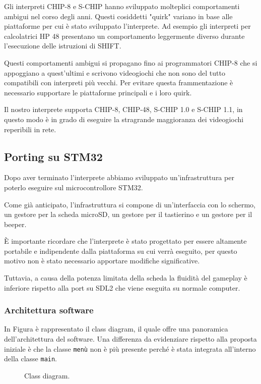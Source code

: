 \documentclass[a4paper]{article}
\begin{document}
Gli interpreti CHIP-8 e S-CHIP hanno sviluppato molteplici
comportamenti ambigui nel corso degli anni. Questi cosiddetti
"quirk" variano in base alle piattaforme per cui è stato sviluppato
l'interprete. Ad esempio gli interpreti per calcolatrici HP 48
presentano un comportamento leggermente diverso durante l'esecuzione
delle istruzioni di SHIFT.

Questi comportamenti ambigui si propagano fino ai programmatori
CHIP-8 che si appoggiano a quest'ultimi e scrivono videogiochi che
non sono del tutto compatibili con interpreti più vecchi. Per evitare
questa frammentazione è necessario supportare le piattaforme
principali e i loro quirk.

Il nostro interprete supporta CHIP-8, CHIP-48, S-CHIP 1.0 e
S-CHIP 1.1, in questo modo è in grado di eseguire la stragrande
maggioranza dei videogiochi reperibili in rete.

\subsection{Porting su STM32}

Dopo aver terminato l'interprete abbiamo sviluppato un'infrastruttura per poterlo eseguire
sul microcontrollore STM32.

Come già anticipato, l'infrastruttura si compone di un'interfaccia con lo schermo,
un gestore per la scheda microSD, un gestore per il tastierino e un gestore per il beeper.

È importante ricordare che l'interprete è stato progettato per essere altamente portabile
e indipendente dalla piattaforma su cui verrà eseguito, per questo motivo non è stato necessario
apportare modifiche significative.

Tuttavia, a causa della potenza limitata della scheda la fluidità del gameplay è inferiore
rispetto alla port su SDL2 che viene eseguita su normale computer.

\subsubsection{Architettura software}

In Figura \label{fig:class_diagram} è rappresentato il class diagram, il quale offre una panoramica
dell'architettura del software. Una differenza da evidenziare rispetto alla proposta iniziale
è che la classe \texttt{menù} non è più presente perché è stata integrata all'interno della
classe \texttt{main}.

\begin{figure}[h!t]
    \begin{center}
        \begin{tikzpicture}[scale=0.6, transform shape]
            
        \end{tikzpicture}
    \end{center}
    \caption{
       Class diagram.
    }
    \label{fig:class_diagram}
\end{figure}
\end{document}
